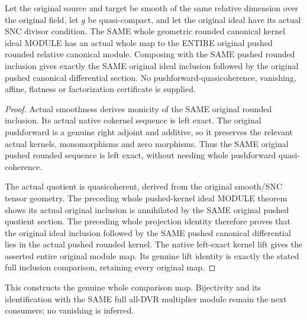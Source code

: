 \begin{theorem}
\label{sc0-rounded-kernel-map:whole-original-lift}
\leanok
Let the original source and target be smooth of the same relative
dimension over the original field, let $g$ be quasi-compact, and
let the original ideal have its actual SNC divisor condition.
The SAME whole geometric rounded canonical kernel ideal MODULE
has an actual whole map to the ENTIRE original pushed rounded
relative canonical module. Composing with the SAME pushed rounded
inclusion gives exactly the SAME original ideal inclusion followed
by the original pushed canonical differential section.
No pushforward-quasicoherence, vanishing, affine, flatness or
factorization certificate is supplied.
\end{theorem}
\begin{proof}
Actual smoothness derives monicity of the SAME original rounded
inclusion. Its actual native cokernel sequence is left exact.
The original pushforward is a genuine right adjoint and additive,
so it preserves the relevant actual kernels, monomorphisms and
zero morphisms. Thus the SAME original pushed rounded sequence
is left exact, without needing whole pushforward quasi-coherence.

The actual quotient is quasicoherent, derived from the original
smooth/SNC tensor geometry. The preceding whole pushed-kernel
ideal MODULE theorem shows its actual original inclusion is
annihilated by the SAME original pushed quotient section.
The preceding whole projection identity therefore proves that
the original ideal inclusion followed by the SAME pushed canonical
differential lies in the actual pushed rounded kernel. The native
left-exact kernel lift gives the asserted entire original module
map. Its genuine lift identity is exactly the stated full
inclusion comparison, retaining every original map.
\end{proof}

This constructs the genuine whole comparison map. Bijectivity
and its identification with the SAME full all-DVR multiplier
module remain the next consumers; no vanishing is inferred.
